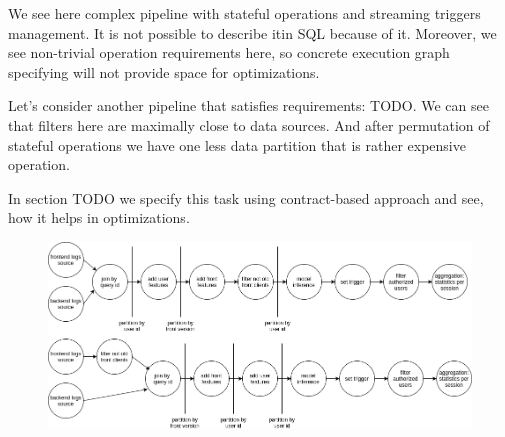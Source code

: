 We see here complex pipeline with stateful operations and streaming triggers management.
It is not possible to describe itin SQL because of it.
Moreover, we see non-trivial operation requirements here, so concrete execution graph specifying will not provide space for optimizations.

Let's consider another pipeline that satisfies requirements: TODO. %
We can see that filters here are maximally close to data sources.
And after permutation of stateful operations we have one less data partition that is rather expensive operation.

In section TODO %
we specify this task using contract-based approach and see, how it helps in optimizations.

\begin{figure}
    \label{fig:running-example-suboptimal}
    \label{fig:running-example-optimal}
    \includegraphics[width=\linewidth]{images/debs-calco-example}
\end{figure}
